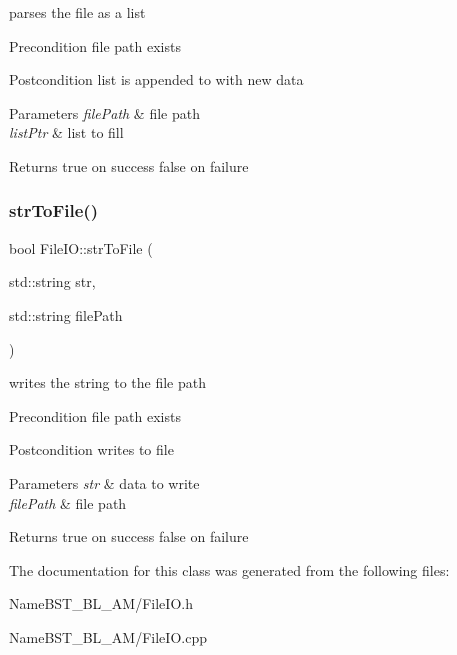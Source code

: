 parses the file as a list \begin{DoxyPrecond}{Precondition}
file path exists 
\end{DoxyPrecond}
\begin{DoxyPostcond}{Postcondition}
list is appended to with new data 
\end{DoxyPostcond}

\begin{DoxyParams}{Parameters}
{\em file\+Path} & file path \\
\hline
{\em list\+Ptr} & list to fill \\
\hline
\end{DoxyParams}
\begin{DoxyReturn}{Returns}
true on success false on failure 
\end{DoxyReturn}
\mbox{\label{class_file_i_o_ac3a2546c33e52aab6f4b9376d5c41d5e}} 
\subsubsection{\texorpdfstring{str\+To\+File()}{strToFile()}}
{\footnotesize\ttfamily bool File\+I\+O\+::str\+To\+File (\begin{DoxyParamCaption}\item[{std\+::string}]{str,  }\item[{std\+::string}]{file\+Path }\end{DoxyParamCaption})\hspace{0.3cm}{\ttfamily [static]}}

writes the string to the file path \begin{DoxyPrecond}{Precondition}
file path exists 
\end{DoxyPrecond}
\begin{DoxyPostcond}{Postcondition}
writes to file 
\end{DoxyPostcond}

\begin{DoxyParams}{Parameters}
{\em str} & data to write \\
\hline
{\em file\+Path} & file path \\
\hline
\end{DoxyParams}
\begin{DoxyReturn}{Returns}
true on success false on failure 
\end{DoxyReturn}


The documentation for this class was generated from the following files\+:\begin{DoxyCompactItemize}
\item 
Name\+B\+S\+T\+\_\+\+B\+L\+\_\+\+A\+M/File\+I\+O.\+h\item 
Name\+B\+S\+T\+\_\+\+B\+L\+\_\+\+A\+M/File\+I\+O.\+cpp\end{DoxyCompactItemize}
